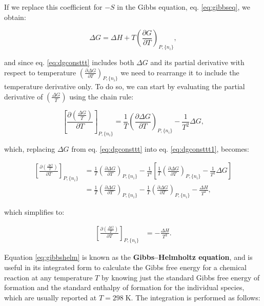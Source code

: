 \documentclass[
  9pt,
]{extbook}
\theoremstyle{definition}
\theoremstyle{definition}
\theoremstyle{definition}
\theoremstyle{remark}
\begin{document}
If we replace this coefficient for \(-S\) in the Gibbs equation, eq. \eqref{eq:gibbseq}, we obtain:

\begin{equation}
\Delta G = \Delta H + T \left(\frac{\partial G}{\partial T} \right)_{P,\{n_i\}},
\label{eq:dgconsttt}
\end{equation}

and since eq. \eqref{eq:dgconsttt} includes both \(\Delta G\) and its partial derivative with respect to temperature \(\left(\frac{\partial \Delta G}{\partial T} \right)_{P,\{n_i\}}\) we need to rearrange it to include the temperature derivative only. To do so, we can start by evaluating the partial derivative of \(\left( \frac{\Delta G}{T} \right)\) using the chain rule:

\begin{equation}
\left[ \frac{\partial\left( \frac{\Delta G}{T} \right)}{\partial T} \right]_{P,\{n_i\}} = \frac{1}{T} \left(\frac{\partial \Delta G}{\partial T}  \right)_{P,\{n_i\}} - \frac{1}{T^2}\Delta G,
\label{eq:dgconsttt1}
\end{equation}

which, replacing \(\Delta G\) from eq. \eqref{eq:dgconsttt} into eq. \eqref{eq:dgconsttt1}, becomes:

\begin{equation}
\begin{aligned}
\left[ \frac{\partial\left( \frac{\Delta G}{T} \right)}{\partial T} \right]_{P,\{n_i\}} &= \frac{1}{T} \left(\frac{\partial \Delta G}{\partial T}  \right)_{P,\{n_i\}} - \frac{1}{T^2} \left[  \frac{1}{T} \left(\frac{\partial \Delta G}{\partial T}  \right)_{P,\{n_i\}} - \frac{1}{T^2}\Delta G \right] \\
&= \frac{1}{T} \left(\frac{\partial \Delta G}{\partial T}  \right)_{P,\{n_i\}}-\frac{1}{T} \left(\frac{\partial \Delta G}{\partial T}  \right)_{P,\{n_i\}} - \frac{\Delta H}{T^2},
\end{aligned}
\label{eq:dgconsttt2}
\end{equation}

which simplifies to:

\begin{equation}
\begin{aligned}
\left[ \frac{\partial\left( \frac{\Delta G}{T} \right)}{\partial T} \right]_{P,\{n_i\}} &= - \frac{\Delta H}{T^2}.
\end{aligned}
\label{eq:gibbshelm}
\end{equation}

Equation \eqref{eq:gibbshelm} is known as the \textbf{Gibbs--Helmholtz equation}, and is useful in its integrated form to calculate the Gibbs free energy for a chemical reaction at any temperature \(T\) by knowing just the standard Gibbs free energy of formation and the standard enthalpy of formation for the individual species, which are usually reported at \(T=298\;\text{K}\). The integration is performed as follows:
\end{document}
